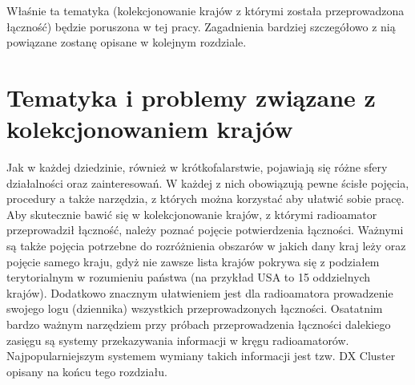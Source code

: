 \documentclass[]{mgr}
\begin{document}
                Właśnie ta tematyka (kolekcjonowanie krajów z którymi została przeprowadzona łączność) będzie poruszona w tej pracy. Zagadnienia bardziej szczegółowo z nią powiązane zostanę opisane w kolejnym rozdziale.

    \chapter{Tematyka i problemy związane z kolekcjonowaniem krajów}
    \label{sec:collecting_entities}

    Jak w każdej dziedzinie, również w krótkofalarstwie, pojawiają się różne sfery działalności oraz zainteresowań. W każdej z nich obowiązują pewne ścisłe pojęcia, procedury a także narzędzia, z których można korzystać aby ułatwić sobie pracę. Aby skutecznie bawić się w kolekcjonowanie krajów, z którymi radioamator przeprowadził łączność, należy poznać pojęcie potwierdzenia łączności. Ważnymi są także pojęcia potrzebne do rozróżnienia obszarów w jakich dany kraj leży oraz pojęcie samego kraju, gdyż nie zawsze lista krajów pokrywa się z podziałem terytorialnym w rozumieniu państwa (na przykład USA to 15 oddzielnych krajów). Dodatkowo znacznym ułatwieniem jest dla radioamatora prowadzenie swojego logu (dziennika) wszystkich przeprowadzonych łączności. Osatatnim bardzo ważnym narzędziem przy próbach przeprowadzenia łączności dalekiego zasięgu są systemy przekazywania informacji w kręgu radioamatorów. Najpopularniejszym systemem wymiany takich informacji jest tzw. DX Cluster opisany na końcu tego rozdziału.
\end{document}
